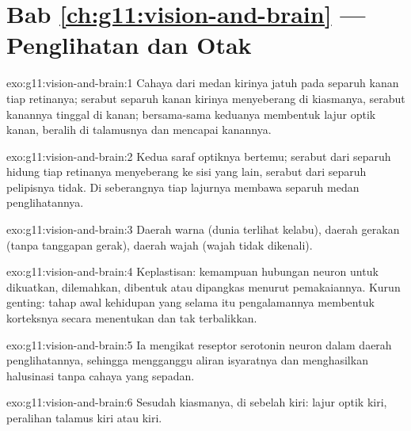 \section*{Bab \ref{ch:g11:vision-and-brain} --- Penglihatan dan Otak}

\begin{solution}{exo:g11:vision-and-brain:1}
Cahaya dari medan kirinya jatuh pada separuh kanan tiap retinanya;
serabut separuh kanan  kirinya menyeberang di kiasmanya, serabut
 kanannya tinggal di kanan; bersama-sama keduanya membentuk lajur
optik kanan, beralih di talamusnya dan mencapai  kanannya.
\end{solution}

\begin{solution}{exo:g11:vision-and-brain:2}
Kedua saraf optiknya bertemu; serabut dari separuh hidung tiap retinanya
menyeberang ke sisi yang lain, serabut dari separuh pelipisnya tidak.
Di seberangnya tiap lajurnya membawa separuh medan penglihatannya.
\end{solution}

\begin{solution}{exo:g11:vision-and-brain:3}
Daerah warna (dunia terlihat kelabu), daerah gerakan (tanpa tanggapan
gerak), daerah wajah (wajah tidak dikenali).
\end{solution}

\begin{solution}{exo:g11:vision-and-brain:4}
Keplastisan: kemampuan hubungan neuron untuk dikuatkan, dilemahkan,
dibentuk atau dipangkas menurut pemakaiannya. Kurun genting: tahap awal
kehidupan yang selama itu pengalamannya membentuk korteksnya secara
menentukan dan tak terbalikkan.
\end{solution}

\begin{solution}{exo:g11:vision-and-brain:5}
Ia mengikat reseptor serotonin neuron dalam daerah penglihatannya,
sehingga mengganggu aliran isyaratnya dan menghasilkan halusinasi tanpa
cahaya yang sepadan.
\end{solution}

\begin{solution}{exo:g11:vision-and-brain:6}
Sesudah kiasmanya, di sebelah kiri: lajur optik kiri, peralihan
talamus kiri atau  kiri.
\end{solution}

